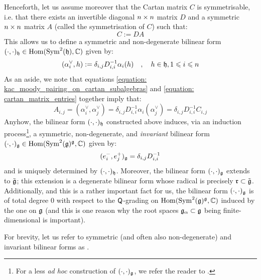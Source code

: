         Henceforth, let us assume moreover that the Cartan matrix $C$ is symmetrisable, i.e. that there exists an invertible diagonal $n \x n$ matrix $D$ and a symmetric $n \x n$ matrix $A$ (called the symmetrisation of $C$) such that:
            $$C := DA$$
        This allows us to define a symmetric and non-degenerate bilinear form $(\cdot, \cdot)_{\mathfrak{h}} \in \operatorname{Hom}( \operatorname{Sym}^2(\mathfrak{h}), \mathbb{C} )$ given by:
            \begin{equation} \label{equation: kac_moody_pairing_on_cartan_subalgebras}
                ( \alpha_i^{\vee}, h ) := \delta_{i, j} D_{i, i}^{-1} \alpha_i(h) \quad, \quad h \in \mathfrak{h}, 1 \leqslant i \leqslant n
            \end{equation}
        As an aside, we note that equations \eqref{equation: kac_moody_pairing_on_cartan_subalgebras} and \eqref{equation: cartan_matrix_entries} together imply that:
            $$A_{i, j} = (\alpha_i^{\vee}, \alpha_j^{\vee}) = \delta_{i, j} D_{i, i}^{-1} \alpha_i( \alpha_j^{\vee} ) = \delta_{i, j} D_{i, i}^{-1} C_{i, j}$$
        Anyhow, the bilinear form $(\cdot, \cdot)_{\mathfrak{h}}$ constructed above induces, via an induction process\footnote{For a less \textit{ad hoc} construction of $(\cdot, \cdot)_{\mathfrak{g}}$, we refer the reader to \cite{neher_pianzola_prelat_sepp_invariant_bilinear_forms_via_fppf_descent}.}, a symmetric, non-degenerate, and \textit{invariant} bilinear form $(\cdot, \cdot)_{\mathfrak{g}} \in \operatorname{Hom}( \operatorname{Sym}^2(\mathfrak{g})^{\mathfrak{g}}, \mathbb{C} )$ given by:
            \begin{equation} \label{equation: kac_moody_pairing}
                ( e_i^-, e_j^+ )_{\mathfrak{g}} = \delta_{i, j} D_{i, i}^{-1}
            \end{equation}
        and is uniquely determined by $(\cdot, \cdot)_{\mathfrak{h}}$. Moreover, the bilinear form $(\cdot, \cdot)_{\mathfrak{g}}$ extends to $\tilde{\mathfrak{g}}$; this extension is a degenerate bilinear form whose radical is precisely $\mathfrak{r} \subset \tilde{\mathfrak{g}}$. Additionally, and this is a rather important fact for us, the bilinear form $(\cdot, \cdot)_{\mathfrak{g}}$ is of total degree $0$ with respect to the $\mathsf{Q}$-grading on $\operatorname{Hom}( \operatorname{Sym}^2(\mathfrak{g})^{\mathfrak{g}}, \mathbb{C} )$ induced by the one on $\mathfrak{g}$ (and this is one reason why the root spaces $\mathfrak{g}_{\alpha} \subset \mathfrak{g}$ being finite-dimensional is important).
        \begin{convention}
            For brevity, let us refer to symmetric (and often also non-degenerate) and invariant bilinear forms as .
        \end{convention}

